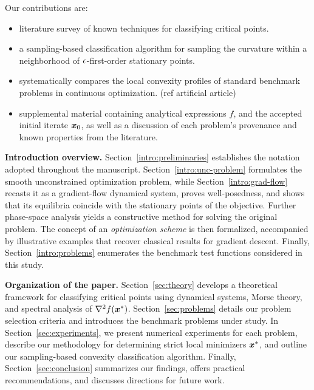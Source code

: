 \documentclass[10pt]{article}
\begin{document}
    \medskip

    Our contributions are:
    \begin{itemize}
        \item literature survey of known techniques for classifying critical points.
        \item a sampling-based classification algorithm for sampling the curvature
        within a neighborhood of $\epsilon$-first-order stationary points. 
        \item systematically compares the local convexity profiles of standard
        benchmark problems in continuous optimization. (ref artificial article)
        \item supplemental material containing analytical expressions $f$, and the
        accepted initial iterate $\bm{x}_0$, as well as a discussion of
        each problem's provenance and known properties from the literature. 
    \end{itemize}
    
    \medskip

    \textbf{Introduction overview.} Section~\ref{intro:preliminaries} establishes the notation adopted throughout the manuscript.  
    Section~\ref{intro:unc-problem} formulates the smooth unconstrained optimization problem, while Section~\ref{intro:grad-flow} 
    recasts it as a gradient-flow dynamical system, proves well-posedness, and shows that its equilibria coincide with the stationary
    points of the objective. Further phase-space analysis yields a constructive method for solving the original problem.  
    The concept of an \emph{optimization scheme} is then formalized, accompanied by illustrative examples that recover 
    classical results for gradient descent. Finally, Section~\ref{intro:problems} enumerates the benchmark test functions
    considered in this study.

    \medskip

    \textbf{Organization of the paper.} Section~\ref{sec:theory} develops a theoretical framework for classifying critical 
    points using dynamical systems, Morse theory, and spectral analysis of $\nabla^2 f(\bm{x}^*)$. Section~\ref{sec:problems} 
    details our problem selection criteria and introduces the benchmark problems under study. In Section~\ref{sec:experiments}, 
    we present numerical experiments for each problem, describe our methodology for determining strict local minimizers $\bm{x}^*$,
    and outline our sampling-based convexity classification algorithm. Finally, Section~\ref{sec:conclusion} summarizes our findings, 
    offers practical recommendations, and discusses directions for future work.
\end{document}
